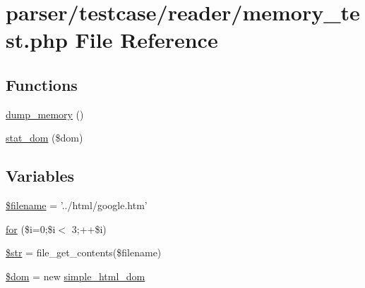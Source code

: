 \hypertarget{reader_2memory__test_8php}{\section{parser/testcase/reader/memory\+\_\+test.php File Reference}
\label{reader_2memory__test_8php}
}
\subsection*{Functions}
\begin{DoxyCompactItemize}
\item 
\hyperlink{reader_2memory__test_8php_a12fd186abfebd6b4c07d0367303445be}{dump\+\_\+memory} ()
\item 
\hyperlink{reader_2memory__test_8php_a9347bfb75df1733370e88d75d3264bda}{stat\+\_\+dom} (\$dom)
\end{DoxyCompactItemize}
\subsection*{Variables}
\begin{DoxyCompactItemize}
\item 
\hyperlink{reader_2memory__test_8php_a0722441477f957078ee2437054556cbc}{\$filename} = '../html/google.\+htm'
\item 
\hyperlink{reader_2memory__test_8php_a96a180adad97b3c9408273563eb638d2}{for} (\$i=0;\$i$<$ 3;++\$i)
\item 
\hyperlink{reader_2memory__test_8php_a7542d95618011800c61773127fa625cf}{\$str} = file\+\_\+get\+\_\+contents(\$filename)
\item 
\hyperlink{reader_2memory__test_8php_a46127a794280dd592812c25b62af34b0}{\$dom} = new \hyperlink{classsimple__html__dom}{simple\+\_\+html\+\_\+dom}
\end{DoxyCompactItemize}



